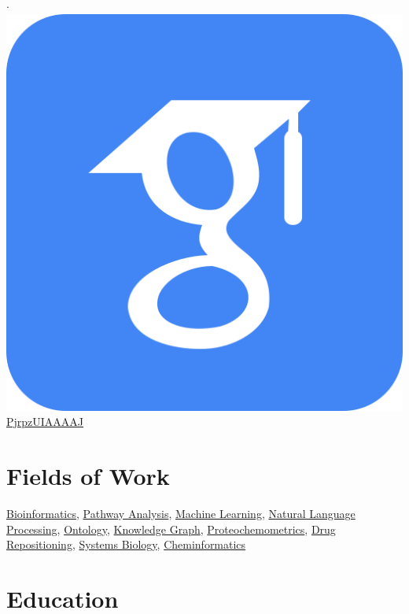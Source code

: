 \documentclass[10pt,a4paper,sans]{moderncv} %
\begin{document}
$\cdot$
\href{https://scholar.google.com/citations?user=PjrpzUIAAAAJ}{\includegraphics[scale=0.015625]{img/google_scholar_icon_130918} PjrpzUIAAAAJ}

\section{Fields of Work}\label{sec:fields}

    \href{https://bioregistry.io/wikidata:Q128570}{Bioinformatics},     \href{https://bioregistry.io/wikidata:Q25303877}{Pathway Analysis},     \href{https://bioregistry.io/wikidata:Q2539}{Machine Learning},     \href{https://bioregistry.io/wikidata:Q30642}{Natural Language Processing},     \href{https://bioregistry.io/wikidata:Q324254}{Ontology},     \href{https://bioregistry.io/wikidata:Q33002955}{Knowledge Graph},     \href{https://bioregistry.io/wikidata:Q50327360}{Proteochemometrics},     \href{https://bioregistry.io/wikidata:Q5308921}{Drug Repositioning},     \href{https://bioregistry.io/wikidata:Q815297}{Systems Biology},     \href{https://bioregistry.io/wikidata:Q910164}{Cheminformatics}

    \section{Education}\label{sec:education}
\end{document}
